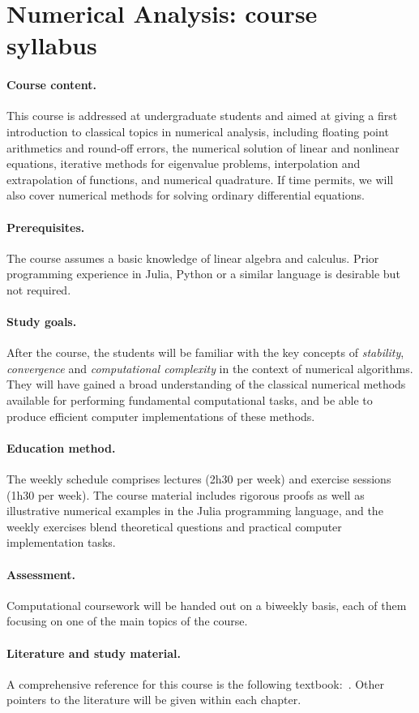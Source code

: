 \documentclass[a4paper,11pt]{article}
\begin{document}
\section*{Numerical Analysis: course syllabus}%

\paragraph{Course content.}%
This course is addressed at undergraduate students and aimed at giving a first introduction to classical topics in numerical analysis,
including floating point arithmetics and round-off errors,
the numerical solution of linear and nonlinear equations,
iterative methods for eigenvalue problems,
interpolation and extrapolation of functions,
and numerical quadrature.
If time permits, we will also cover numerical methods for solving ordinary differential equations.

\paragraph{Prerequisites.}%
The course assumes a basic knowledge of linear algebra and calculus.
Prior programming experience in Julia, Python or a similar language is desirable but not required.

\paragraph{Study goals.}%
After the course,
the students will be familiar with the key concepts of \emph{stability}, \emph{convergence} and \emph{computational complexity} in the context of numerical algorithms.
They will have gained a broad understanding of the classical numerical methods available for performing fundamental computational tasks,
and be able to produce efficient computer implementations of these methods.

\paragraph{Education method.}%
The weekly schedule comprises lectures (2h30 per week) and exercise sessions (1h30 per week).
The course material includes rigorous proofs as well as illustrative numerical examples in the Julia programming language,
and the weekly exercises blend theoretical questions and practical computer implementation tasks.

\paragraph{Assessment.}%
\label{par:assessment}
Computational coursework will be handed out on a biweekly basis,
each of them focusing on one of the main topics of the course.

\paragraph{Literature and study material.}%
A comprehensive reference for this course is the following textbook:~.
Other pointers to the literature will be given within each chapter.
\end{document}
